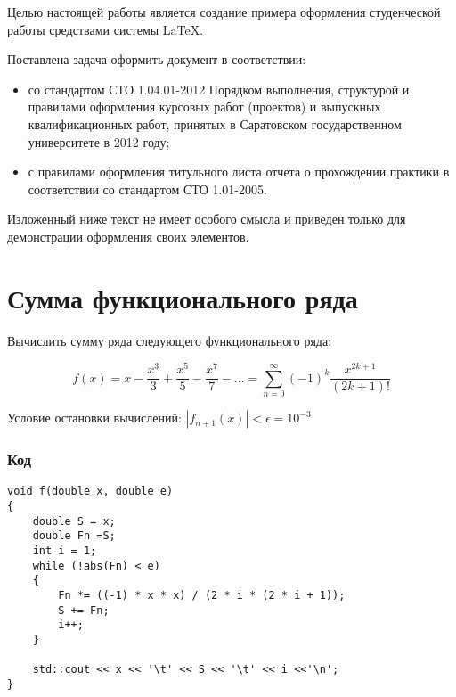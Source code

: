 \documentclass[bachelor, och, pract]{SCWorks}
\begin{document}
\tableofcontents






\intro
Целью настоящей работы является создание примера оформления студенческой работы средствами системы \LaTeX.

Поставлена задача оформить документ в соответствии:
\begin{itemize}
    \item со стандартом СТО 1.04.01-2012 Порядком выполнения, структурой и правилами оформления курсовых работ (проектов)
    и выпускных квалификационных работ, принятых в Саратовском государственном университете в 2012 году;
    \item с правилами оформления титульного листа отчета о прохождении практики в соответствии со стандартом СТО 1.01-2005.
\end{itemize}

Изложенный ниже текст не имеет особого смысла и приведен только для демонстрации оформления своих элементов.

\section{Сумма функционального ряда}

Вычислить сумму ряда следующего функционального ряда:

$$ f(x) = x - \frac{x^3}{3} + \frac{x^5}{5} - \frac{x^7}{7} - ... =  \sum_{n=0}^{\infty} (-1)^k\frac{x^{2k+1}}{(2k+1)!}$$

Условие остановки вычислений: $|f_{n+1}(x)| < \epsilon = 10^{-3}$

\subsubsection{Код}

\begin{lstlisting}
void f(double x, double e)
{
    double S = x;
    double Fn =S;
    int i = 1;
    while (!abs(Fn) < e)
    {
        Fn *= ((-1) * x * x) / (2 * i * (2 * i + 1));
        S += Fn;
        i++;
    }
    
    std::cout << x << '\t' << S << '\t' << i <<'\n';
}
\end{lstlisting}
\end{document}
